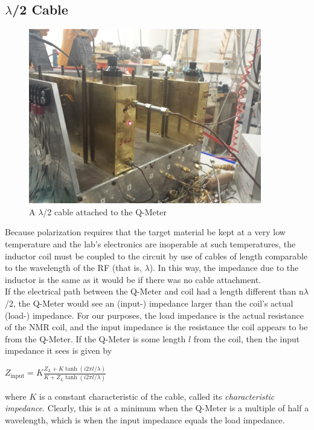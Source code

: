 \subsection{$\lambda$/2 Cable}

\begin{figure}
  \centering
  \includegraphics[width=4in, angle=0]{img/NMR-lambda-cable.jpg}
  \caption{A $\lambda$/2 cable attached to the Q-Meter}
  \label{NMR-lambda-cable}
\end{figure}
Because polarization requires that the target material be kept at a very low temperature and the lab's electronics are inoperable at such temperatures, the inductor coil must be coupled to the circuit by use of cables of length comparable to the wavelength of the RF (that is, $\lambda$).  In this way, the impedance due to the inductor is the same as it would be if there was no cable attachment. \\

If the electrical path between the Q-Meter and coil had a length different than n$\lambda$/2, the Q-Meter would see an (input-) impedance larger than the coil's actual (load-) impedance. For our purposes, the load impedance is the actual resistance of the NMR coil, and the input impedance is the resistance the coil appears to be from the Q-Meter.  If the Q-Meter is some length $l$ from the coil, then the input impedance it sees is given by

\begin{center}
  $Z_{\textrm{input}} = K\frac{Z_L+K\tanh(i2\pi l/\lambda)}{K+Z_L\tanh(i2\pi l/\lambda)}$
\end{center}
where $K$ is a constant characteristic of the cable, called its \textit{characteristic impedance}.  Clearly, this is at a minimum when the Q-Meter is a multiple of half a wavelength, which is when the input impedance equals the load impedance.\\

